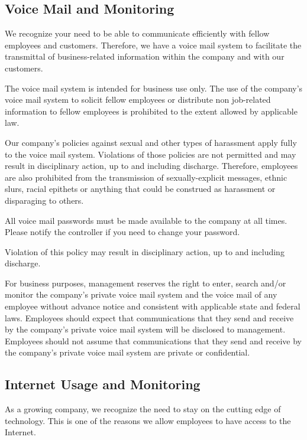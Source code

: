 \documentclass{book}
\begin{document}
\subsection{Voice Mail and Monitoring}

We recognize your need to be able to communicate efficiently with fellow employees and customers. Therefore, we have a voice mail system to facilitate the transmittal of business-related information within the company and with our customers.

The voice mail system is intended for business use only. The use of the company's voice mail system to solicit fellow employees or distribute non job-related information to fellow employees is prohibited to the extent allowed by applicable law.

Our company's policies against sexual and other types of harassment apply fully to the voice mail system. Violations of those policies are not permitted and may result in disciplinary action, up to and including discharge. Therefore, employees are also prohibited from the transmission of sexually-explicit messages, ethnic slurs, racial epithets or anything that could be construed as harassment or disparaging to others.

All voice mail passwords must be made available to the company at all times. Please notify the controller if you need to change your password.

Violation of this policy may result in disciplinary action, up to and including discharge.

For business purposes, management reserves the right to enter, search and/or monitor the company's private voice mail system and the voice mail of any employee without advance notice and consistent with applicable state and federal laws. Employees should expect that communications that they send and receive by the company's private voice mail system will be disclosed to management. Employees should not assume that communications that they send and receive by the company's private voice mail system are private or confidential.

\subsection{Internet Usage and Monitoring}

As a growing company, we recognize the need to stay on the cutting edge of technology. This is one of the reasons we allow employees to have access to the Internet.
\end{document}
